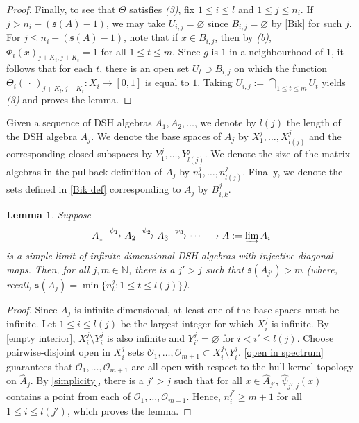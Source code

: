 \documentclass[12pt]{amsart}
\numberwithin{equation}{section}
\newtheorem{lemma}[theorem]{Lemma}
\theoremstyle{definition}
\theoremstyle{remark}
\newcommand{\NN}{\mathbb{N}}
\begin{document}
\begin{proof}
	Finally, to see that $\Theta$ satisfies \textit{(3)}, fix $1\leq i\leq  l $ and $1\leq j\leq n_{i}$. If $j>n_{i}-(\mathfrak{s}(A)-1)$, we may take $U_{i,j}=\varnothing$ since $B_{i,j}=\varnothing$ by \autoref{Bik} for such $j$. For $j\leq n_{i}-(\mathfrak{s}(A)-1)$, note that if $x\in B_{i,j}$, then by \textit{(b)}, $\Phi_{i}(x)_{j+K_{t},j+K_{t}}=1$ for all $1\leq t\leq m$. Since $g$ is $1$ in a neighbourhood of $1$, it follows that for each $t$, there is an open set $U_{t}\supset B_{i,j}$ on which the function $\Theta_{i}(\,\cdot\,)_{j+K_{t},j+K_{t}}\colon X_{i}\to [0,1]$ is equal to $1$. Taking $U_{i,j}:=\bigcap_{1\leq t\leq m} U_{t}$ yields \textit{(3)} and proves the lemma. 
\end{proof}





Given a sequence of DSH algebras $A_{1},A_{2},\ldots$, we denote by $ l (j)$ the length of the DSH algebra $A_{j}$. We denote the base spaces of $A_{j}$ by $X^{j}_{1},\ldots,X^{j}_{ l (j)}$ and the corresponding closed subspaces by $Y^{j}_{1},\ldots,Y^{j}_{ l (j)}$. We denote the size of the matrix algebras in the pullback definition of $A_{j}$ by $n^{j}_{1},\ldots,n^{j}_{ l (j)}$. Finally, we denote the sets defined in \autoref{Bik def} corresponding to $A_{j}$ by $B^{j}_{i,k}$. 

\begin{lemma}
	\label{big enough lemma}
	Suppose 
	$$
	A_{1}\overset{\psi_{1}}{\longrightarrow} A_{2}\overset{\psi_{2}}{\longrightarrow} A_{3}\overset{\psi_{3}}{\longrightarrow}\cdots\longrightarrow A:=\varinjlim A_{i}
	$$
	is a simple limit of infinite-dimensional DSH algebras with injective diagonal maps. Then, for all $j,m\in\NN$, there is a $j'>j$ such that $\mathfrak{s}(A_{j'})>m$ (where, recall, $\mathfrak{s}(A_{j})=\min\{n^{j}_{t}:1\leq t\leq l (j)\}$). 
\end{lemma}
\begin{proof}
	Since $A_{j}$ is infinite-dimensional, at least one of the base spaces must be infinite. Let $1\leq i\leq  l (j)$ be the largest integer for which $X_{i}^{j}$ is infinite. By \autoref{empty interior}, $X_{i}^{j}\setminus Y_{i}^{j}$ is also infinite and $Y_{i'}^{j}=\varnothing$ for $i<i'\leq  l (j)$. Choose pairwise-disjoint open in $X_{i}^{j}$ sets $\mathcal{O}_{1},\ldots,\mathcal{O}_{m+1}\subset X_{i}^{j}\setminus Y_{i}^{j}$. \autoref{open in spectrum} guarantees that $\mathcal{O}_{1},\ldots,\mathcal{O}_{m+1}$ are all open with respect to the hull-kernel topology on $\hat{A}_{j}$. By \autoref{simplicity}, there is a $j'>j$ such that for all $x\in \hat{A}_{j'}$, $\hat{\psi}_{j',j}(x)$ contains a point from each of $\mathcal{O}_{1},\ldots,\mathcal{O}_{m+1}$. Hence, $n_{i}^{j'}\geq m+1$ for all $1\leq i\leq  l (j')$, which proves the lemma.
\end{proof}
\end{document}
